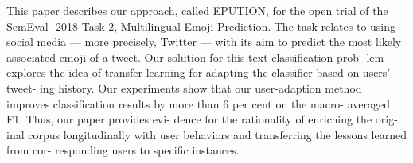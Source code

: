 This paper describes our approach, called EPUTION, for the open trial of the SemEval- 2018 Task 2, Multilingual Emoji Prediction. The task relates to using social media — more precisely, Twitter — with its aim to predict the most likely associated emoji of a tweet. Our solution for this text classification prob- lem explores the idea of transfer learning for adapting the classifier based on users' tweet- ing history. Our experiments show that our user-adaption method improves classification results by more than 6 per cent on the macro- averaged F1. Thus, our paper provides evi- dence for the rationality of enriching the orig- inal corpus longitudinally with user behaviors and transferring the lessons learned from cor- responding users to specific instances.
